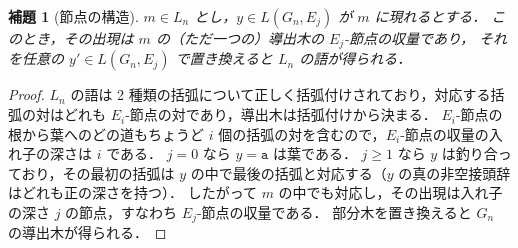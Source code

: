 \documentclass[11pt,a4paper]{ltjsarticle}
\numberwithin{equation}{section}
\theoremstyle{plain}
\newtheorem{lemma}[theorem]{補題}
\theoremstyle{definition}
\theoremstyle{remark}
\theoremstyle{plain}
\newcommand{\ta}{\mathtt a}
\begin{document}
\begin{lemma}[節点の構造]\label{lem:nodes}
$m\in L_n$ とし，$y\in L(G_n,E_j)$ が $m$ に現れるとする．
このとき，その出現は $m$ の（ただ一つの）導出木の $E_j$-節点の収量であり，
それを任意の $y'\in L(G_n,E_j)$ で置き換えると $L_n$ の語が得られる．
\end{lemma}
\begin{proof}
$L_n$ の語は 2 種類の括弧について正しく括弧付けされており，対応する括弧の対はどれも $E_i$-節点の対であり，導出木は括弧付けから決まる．
$E_i$-節点の根から葉へのどの道もちょうど $i$ 個の括弧の対を含むので，$E_i$-節点の収量の入れ子の深さは $i$ である．
$j=0$ なら $y=\ta$ は葉である．
$j\ge1$ なら $y$ は釣り合っており，その最初の括弧は $y$ の中で最後の括弧と対応する（$y$ の真の非空接頭辞はどれも正の深さを持つ）．
したがって $m$ の中でも対応し，その出現は入れ子の深さ $j$ の節点，すなわち $E_j$-節点の収量である．
部分木を置き換えると $G_n$ の導出木が得られる．
\end{proof}
\end{document}
